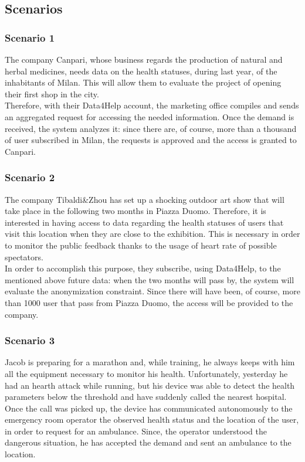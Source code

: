 \subsection{Scenarios}

\subsubsection{Scenario 1}
The company Canpari, whose business regards the production of natural and herbal medicines, needs data on the health statuses, during last year, of the inhabitants of Milan. This will allow them to evaluate the project of opening their first shop in the city. \\
Therefore, with their Data4Help account, the marketing office compiles and sends an aggregated request for accessing the needed information. 
Once the demand is received, the system analyzes it: since there are, of course, more than a thousand of user subscribed in Milan, the requests is approved and the access is granted to Canpari. 

\subsubsection{Scenario 2}
The company Tibaldi\&Zhou has set up a shocking outdoor art show that will take place in the following two months in Piazza Duomo.
Therefore, it is interested in having access to data regarding the health statuses of users that visit this location when they are close to the exhibition.
This is necessary in order to monitor the public feedback thanks to the usage of heart rate of possible spectators. \\
In order to accomplish this purpose, they subscribe, using Data4Help, to the mentioned above future data: when the two months will pass by, the system will evaluate the anonymization constraint. Since there will have been, of course, more than 1000 user that pass from Piazza Duomo, the access will be provided to the company. 

\subsubsection{Scenario 3}
Jacob is preparing for a marathon and, while training, he always keeps with him all the equipment necessary to monitor his health.
Unfortunately, yesterday he had an hearth attack while running, but his device was able to detect the health parameters below the threshold and have suddenly called the nearest hospital. \\
Once the call was picked up, the device has communicated autonomously to the emergency room operator the observed health status and the location of the user, in order to request for an ambulance. 
Since, the operator understood the dangerous situation, he has accepted the demand and sent an ambulance to the location.

